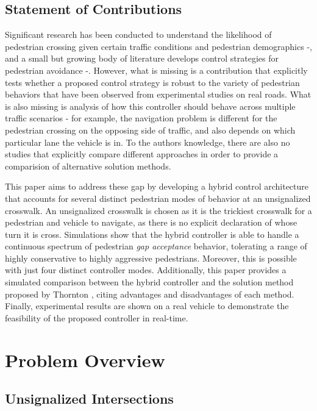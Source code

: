 \documentclass[letterpaper, 10 pt, conference]{ieeeconf}  %
\begin{document}
\subsection{Statement of Contributions}
Significant research has been conducted to understand the likelihood of pedestrian crossing given certain traffic conditions and pedestrian demographics \cite{Schroeder2011} -\cite{Lee2005}, and a small but growing body of literature develops control strategies for pedestrian avoidance \cite{Bandyopadhyay}-\cite{Thornton2018}. However, what is missing is a contribution that explicitly  tests whether a proposed control strategy is robust to the variety of pedestrian behaviors that have been observed from experimental studies on real roads. What is also missing is analysis of how this controller should behave across multiple traffic scenarios - for example, the navigation problem is different for the pedestrian crossing on the opposing side of traffic, and also depends on which particular lane the vehicle is in. To the authors knowledge, there are also no studies that explicitly compare different approaches in order to provide a comparision of alternative solution methods.  

This paper aims to address these gap by developing a hybrid control architecture that accounts for several distinct pedestrian modes of behavior at an unsignalized crosswalk. An unsignalized crosswalk is chosen as it is the trickiest crosswalk for a pedestrian and vehicle to navigate, as there is no explicit declaration of whose turn it is cross. Simulations show that the hybrid controller is able to handle a continuous spectrum of pedestrian \textit{gap acceptance} behavior, tolerating a range of highly conservative to highly aggressive pedestrians. Moreover, this is possible with just four distinct controller modes. Additionally, this paper provides a simulated comparison between the hybrid controller and the solution method proposed by Thornton \cite{Thornton2018}, citing advantages and disadvantages of each method. Finally, experimental results are shown on a real vehicle to demonstrate the feasibility of the proposed controller in real-time. 


\section{Problem Overview}

\subsection{Unsignalized Intersections}
\end{document}
